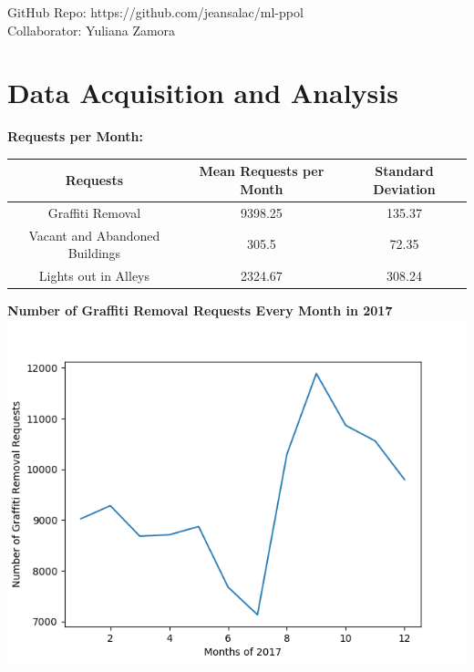 \documentclass[letterpaper,12pt]{article}
\begin{document}
\maketitle
\begin{center}
GitHub Repo: https://github.com/jeansalac/ml-ppol \\
Collaborator: Yuliana Zamora
\end{center}

\section{Data Acquisition and Analysis}
\textbf{Requests per Month:} \\
\begin{center}
\begin{tabular}{ |c|c|c| } 
 \hline
 \textbf{Requests} & \textbf{Mean Requests per Month} & \textbf{Standard Deviation} \\ 
 \hline
 Graffiti Removal & 9398.25 & 135.37 \\ 
 \hline
 Vacant and Abandoned Buildings & 305.5 & 72.35 \\ 
 \hline
 Lights out in Alleys & 2324.67 & 308.24 \\
 \hline
\end{tabular}
\end{center}

\vspace{10mm}

\noindent \textbf{Number of Graffiti Removal Requests Every Month in 2017} \\
\includegraphics[scale=1]{grafovertime.png}
\end{document}
